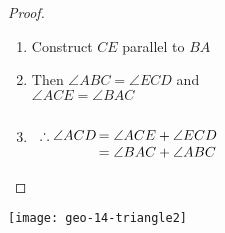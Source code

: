\noindent\begin{minipage}[t]{0.55\textwidth}\vspace{0pt}
\begin{proof}
\begin{enumerate}\itemsep0pt
  \item Construct $CE$ parallel to $BA$
	\item Then $\angle ABC=\angle ECD$ and\\
	$\angle ACE=\angle BAC$
	\item $\begin{array}{r@{\,}l}
	\\[-2pt]
	\therefore\angle ACD & =\angle ACE+\angle ECD\\
	&=\angle BAC+\angle ABC
	\end{array}$
\end{enumerate}
\end{proof}
\end{minipage}\hfill
\begin{minipage}[t]{0.4\textwidth}\vspace{0pt}
\flushright\texttt{[image: geo-14-triangle2]}
\end{minipage}
